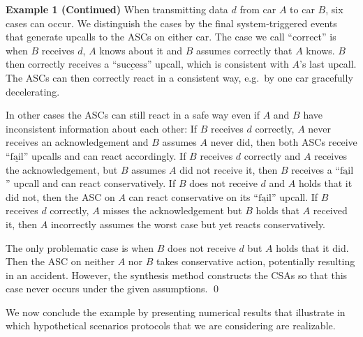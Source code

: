 \documentclass{sig-alternate}
\newenvironment{excont}[1]{\textbf{Example 1 (#1)}}{\qed}
\newcommand{\locev}[1]{\underline{#1}}
\newcommand{\success}{\locev{\mathrm{success}}}
\newcommand{\fail}{\locev{\mathrm{fail}}}
\begin{document}
\begin{excont}{Continued}
When transmitting data $d$ from car $A$ to car $B$, six cases can occur. We distinguish the cases by the final system-triggered events that generate upcalls to the ASCs on either car. The case we call ``correct'' is when $B$ receives $d$, $A$ knows about it and $B$ assumes correctly that $A$ knows. $B$ then correctly receives a ``$\success$'' upcall, which is consistent with $A$'s last upcall. The ASCs can then correctly react in a consistent way, e.g.\ by one car gracefully decelerating.

In other cases the ASCs can still react in a safe way even if $A$ and $B$ have inconsistent information about each other: If $B$ receives $d$ correctly, $A$ never receives an acknowledgement and $B$ assumes $A$ never did, then both ASCs receive ``$\fail$'' upcalls and can react accordingly. If $B$ receives $d$ correctly and $A$ receives the acknowledgement, but $B$ assumes $A$ did not receive it, then $B$ receives a ``$\fail$'' upcall and can react conservatively. If $B$ does not receive $d$ and $A$ holds that it did not, then the ASC on $A$ can react conservative on its ``$\fail$'' upcall. If $B$ receives $d$ correctly, $A$ misses the acknowledgement but $B$ holds that $A$ received it, then $A$ incorrectly assumes the worst case but yet reacts conservatively.

The only problematic case is when $B$ does not receive $d$ but $A$ holds that it did. Then the ASC on neither $A$ nor $B$  takes conservative action, potentially resulting in an accident. However, the synthesis method constructs the CSAs so that this case never occurs under the given assumptions.
\end{excont}

We now conclude the example by presenting numerical results that illustrate in which hypothetical scenarios protocols that we are considering are realizable.
\end{document}
